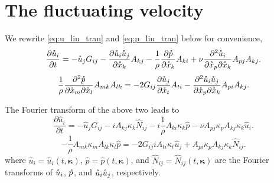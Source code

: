 \documentclass[oneside,a4paper,11pt]{report}
\newcommand{\kappavec}{\boldsymbol{\kappa}}
\begin{document}
\section{The fluctuating velocity}
We rewrite \cref{eq:u_lin_tran} and \cref{eq:p_lin_tran} below for convenience,
\begin{equation}
    \frac{\partial \mathring{u}_i }{\partial t } = -\mathring{u}_j G_{ij} - \frac{\partial \mathring{u}_i \mathring{u}_j}{\partial \mathring{x}_k} A_{kj} - \frac{1}{\rho} \frac{\partial \mathring{p} }{\partial \mathring{x}_k} A_{ki} + \nu \frac{ \partial^2 \mathring{u}_i}{\partial \mathring{x}_p \partial \mathring{x}_k} A_{pj} A_{kj}.
\end{equation}
\begin{equation}
    \frac{1}{\rho} \frac{\partial^2 \mathring{p} }{\partial \mathring{x}_m \partial \mathring{x}_l} A_{mk} A_{lk} = -2 G_{ij} \frac{\partial \mathring{u}_j }{\partial \mathring{x}_t} A_{ti} - \frac{\partial^2 \mathring{u}_i \mathring{u}_j}{\partial \mathring{x}_p \partial \mathring{x}_k} A_{pi}A_{kj}.
\end{equation}

The Fourier transform of the above two leads to
\begin{equation}
\frac{\partial \hat{u}_i }{\partial t } = -\hat{u}_j G_{ij} - i A_{kj}\kappa_k  \hat{N}_{ij} - i\frac{1}{\rho} A_{ki} \kappa_k  \hat{ p } - \nu  A_{pj}\kappa_p A_{kj}\kappa_k \hat{u}_i.
\end{equation}
\begin{equation}
-\frac{1}{\rho} A_{mk}\kappa_m A_{lk}\kappa_l \hat{ p } = -2 G_{ij} i A_{ti}\kappa_t \hat{u}_j + A_{pi}\kappa_p A_{kj}\kappa_k \hat{N}_{ij}.
\end{equation}
where $\hat{u}_i = \hat{u}_i(t,\kappavec)$, $\hat{p} = \hat{p}(t,\kappavec)$, and $\hat{N}_{ij} = \hat{N}_{ij}(t,\kappavec)$ are the Fourier transforms of $\mathring{u}_i$, $\mathring{p}$, and $\mathring{u}_i \mathring{u}_j$, respectively. 
\end{document}
